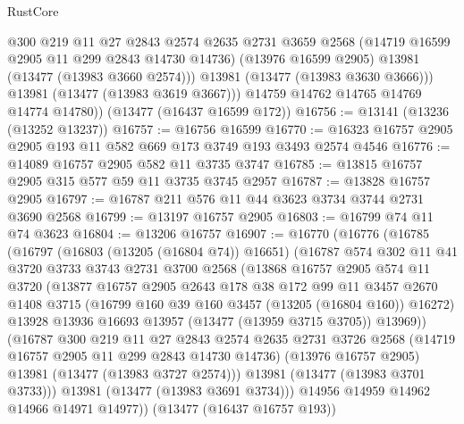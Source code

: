 \begin{lexlean}{RustCore}
\begin{coremodule}
              @300
              @219
              @11
              @27
              @2843
              @2574
              @2635
              @2731
              @3659
              @2568
              (@14719 @16599 @2905 @11 @299 @2843 @14730 @14736)
              (@13976 @16599 @2905)
              @13981
              (@13477 (@13983 @3660 @2574)))
            @13981
            (@13477 (@13983 @3630 @3666)))
          @13981
          (@13477 (@13983 @3619 @3667)))
        @14759
        @14762
        @14765
        @14769
        @14774
        @14780))
    (@13477 (@16437 @16599 @172))
@16756 := @13141 (@13236 (@13252 @13237))
@16757 := @16756 @16599
@16770 := @16323 @16757 @2905 @2905 @193 @11 @582 @669 @173 @3749 @193 @3493 @2574 @4546
@16776 := @14089 @16757 @2905 @582 @11 @3735 @3747
@16785 := @13815 @16757 @2905 @315 @577 @59 @11 @3735 @3745 @2957
@16787 := @13828 @16757 @2905
@16797 := @16787 @211 @576 @11 @44 @3623 @3734 @3744 @2731 @3690 @2568
@16799 := @13197 @16757 @2905
@16803 := @16799 @74 @11 @74 @3623
@16804 := @13206 @16757
@16907 := @16770
    (@16776
      (@16785
        (@16797
          (@16803 (@13205 (@16804 @74)) @16651)
          (@16787
            @574
            @302
            @11
            @41
            @3720
            @3733
            @3743
            @2731
            @3700
            @2568
            (@13868
              @16757
              @2905
              @574
              @11
              @3720
              (@13877
                @16757
                @2905
                @2643
                @178
                @38
                @172
                @99
                @11
                @3457
                @2670
                @1408
                @3715
                (@16799 @160 @39 @160 @3457 (@13205 (@16804 @160)) @16272)
                @13928
                @13936
                @16693
                @13957
                (@13477 (@13959 @3715 @3705))
                @13969))
            (@16787
              @300
              @219
              @11
              @27
              @2843
              @2574
              @2635
              @2731
              @3726
              @2568
              (@14719 @16757 @2905 @11 @299 @2843 @14730 @14736)
              (@13976 @16757 @2905)
              @13981
              (@13477 (@13983 @3727 @2574)))
            @13981
            (@13477 (@13983 @3701 @3733)))
          @13981
          (@13477 (@13983 @3691 @3734)))
        @14956
        @14959
        @14962
        @14966
        @14971
        @14977))
    (@13477 (@16437 @16757 @193))

\end{coremodule}
\end{lexlean}
